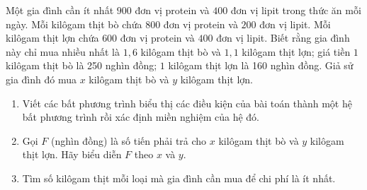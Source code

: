 \begin{bt}%
			Một gia đình cần ít nhất $900$ đơn vị protein và $400$ đơn vị lipit trong thức ăn mỗi ngày. Mỗi kilôgam thịt bò chứa $800$ đơn vị protein và $200$ đơn vị lipit.  Mỗi kilôgam thịt lợn chứa $600$ đơn vị protein và $400$ đơn vị lipit.  Biết rằng gia đình này chỉ mua nhiều nhất là $1{,}6$ kilôgam thịt bò và $1{,}1$ kilôgam thịt lợn; giá tiền $1$ kilôgam thịt bò là 250 nghìn đồng; $1$ kilôgam thịt lợn là 160 nghìn đồng. Giả sử gia đình đó mua $x$ kilôgam thịt bò và $y$ kilôgam thịt lợn.
			\begin{enumerate}
				\item  Viết các bất phương trình biểu thị các điều kiện của bài toán thành một hệ bất phương trình rồi xác định miền nghiệm của hệ đó.
				\item Gọi $F$ (nghìn đồng) là số tiến phải trả cho $x$ kilôgam thịt bò và $y$ kilôgam thịt lợn. Hãy biểu diễn $F$ theo  $x$ và $y$.
				\item Tìm số kilôgam thịt mỗi loại mà gia đình cần mua để chi phí là ít nhất.
			\end{enumerate}
\end{bt}

